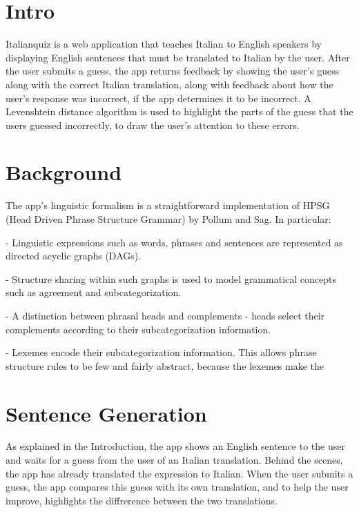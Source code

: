 \section{Intro}

Italianquiz is a web application that teaches Italian to English
speakers by displaying English sentences that must be translated to
Italian by the user. After the user submits a guess, the app returns
feedback by showing the user's guess along with the correct Italian
translation, along with feedback about how the user's response was
incorrect, if the app determines it to be incorrect. A Levenshtein distance
algorithm is used to highlight the parts of the guess that the users
guessed incorrectly, to draw the user's attention to these errors.



\section{Background}

The app's linguistic formalism is a straightforward implementation of
HPSG (Head Driven Phrase Structure Grammar) by Pollum and Sag. In
particular:

- Linguistic expressions such as words, phrases and sentences are
represented as directed acyclic graphs (DAGs).

- Structure sharing within such graphs is used to model grammatical
concepts such as agreement and subcategorization.

- A distinction between phrasal heads and complements - heads select
their complements according to their subcategorization information.

- Lexemes encode their subcategorization information. This allows
phrase structure rules to be few and fairly abstract, because the
lexemes make the 

\section{Sentence Generation}

As explained in the Introduction, the app shows an English sentence to
the user and waits for a guess from the user of an Italian
translation. Behind the scenes, the app has already translated the
expression to Italian. When the user submits a guess, the app compares
this guess with its own translation, and to help the user improve,
highlights the diffrerence between the two translations. 

